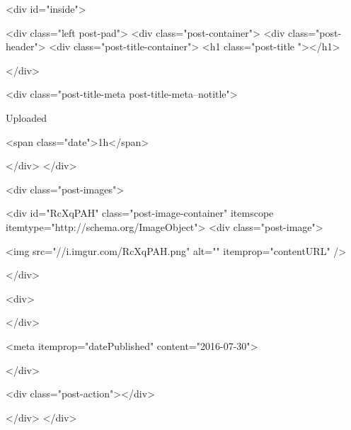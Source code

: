         <div id="inside">
        
        <div class="left post-pad">
            <div class="post-container">
                <div class="post-header">
                    <div class="post-title-container">
                                                    <h1 class="post-title "></h1>
                        
                    </div>

                    <div class="post-title-meta post-title-meta--notitle">
                        

                        
                                                    
                            Uploaded
                        

                                                    <span class="date">1h</span>
                        

                        
                        
                    </div>
                </div>

                <div class="post-images">

                                    
                    
                    

                    <div id="RcXqPAH" class="post-image-container" itemscope itemtype="http://schema.org/ImageObject">
                        <div class="post-image">
    

                        <img src="//i.imgur.com/RcXqPAH.png" alt="" itemprop="contentURL" />
        
    
</div>


                        <div>
                            
                        </div>

                                                    <meta itemprop="datePublished" content="2016-07-30">
                        

                        
                    </div>
                

                

                

                <div class="post-action"></div>

                
                </div>
            </div>

